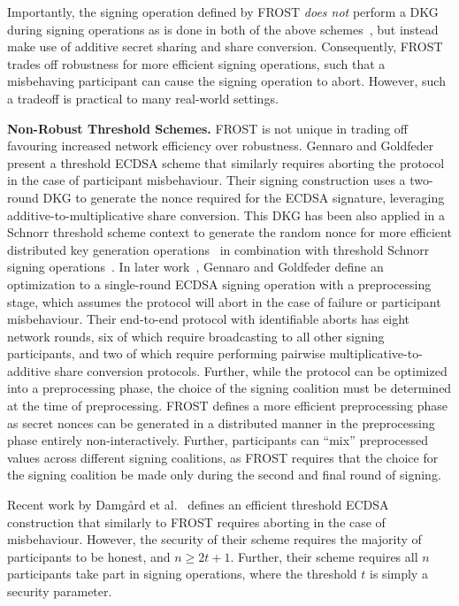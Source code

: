 Importantly, the signing operation defined by FROST \emph{does not} perform a DKG
during signing operations as is done in both of the above schemes~\cite{StinsonR01,GennaroJKR03},
but instead make use of additive secret sharing and share conversion.
Consequently, FROST trades off robustness for more efficient signing
operations,
such that a misbehaving participant can cause the signing operation to abort.
However, such a tradeoff is practical to many real-world settings.


\textbf{Non-Robust Threshold Schemes.} FROST is not unique in trading off
favouring increased network efficiency over robustness.
Gennaro and Goldfeder~\cite{GennaroG19} present a threshold ECDSA
scheme that similarly requires aborting the protocol in the case of
participant misbehaviour. Their signing construction uses a two-round DKG to generate
the nonce required for the ECDSA signature, leveraging additive-to-multiplicative share
conversion. This DKG has been also applied in a Schnorr threshold
scheme context to generate the random nonce for more efficient distributed key
generation operations~\cite{kzen-schnorr} in combination with threshold Schnorr
signing operations~\cite{StinsonR01}.
In later work~\cite{GennaroG20}, Gennaro and Goldfeder define an optimization
to a single-round ECDSA signing operation with a
preprocessing stage, which assumes the protocol will abort in the case of
failure or participant misbehaviour.
Their end-to-end protocol with identifiable aborts has eight network rounds,
six of which require broadcasting to all other signing participants,
and two of which require performing pairwise multiplicative-to-additive
share conversion protocols. Further, while the protocol can be optimized into a
preprocessing phase, the choice of the signing coalition must be determined at
the time of preprocessing.
FROST defines a more efficient preprocessing
phase as secret nonces can be generated in a distributed manner in the
preprocessing phase entirely
non-interactively. Further,
participants can ``mix'' preprocessed values across different signing
coalitions, as FROST requires that the choice for the signing coalition be made
only during the second and final round of signing.

Recent work by Damg\aa{}rd et al.~\cite{DamgardJNPO22} defines an efficient
threshold ECDSA construction that similarly to FROST requires aborting in the case of misbehaviour.
However, the security of their
scheme requires the majority of participants to be honest, and $n \geq 2t+1$.
Further, their scheme requires all $n$ participants take part in signing
operations, where the threshold $t$ is simply a security parameter.

